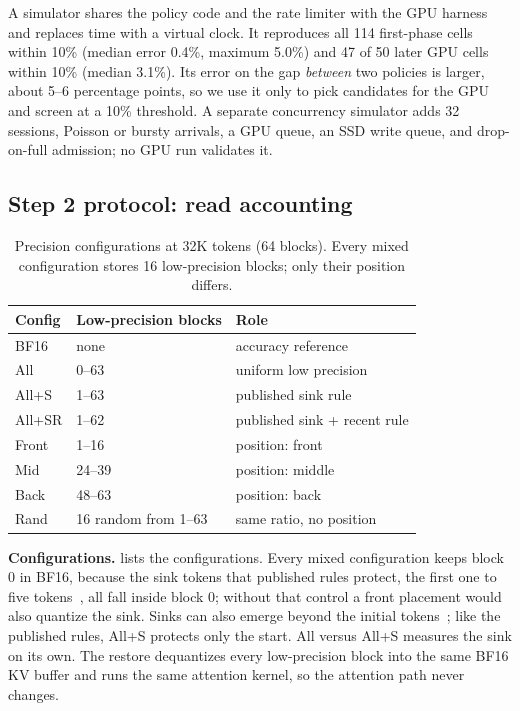 \documentclass[conference]{IEEEtran}
\newcommand{\cfg}[1]{\textsf{#1}}
\begin{document}
A simulator shares the policy code and the rate limiter with the GPU harness and replaces time with a virtual clock.
It reproduces all 114 first-phase cells within 10\% (median error 0.4\%, maximum 5.0\%) and 47 of 50 later GPU cells within 10\% (median 3.1\%).
Its error on the gap \emph{between} two policies is larger, about 5--6 percentage points, so we use it only to pick candidates for the GPU and screen at a 10\% threshold.
A separate concurrency simulator adds 32 sessions, Poisson or bursty arrivals, a GPU queue, an SSD write queue, and drop-on-full admission; no GPU run validates it.

\subsection{Step 2 protocol: read accounting}\label{sec:method-precision}

\begin{table}[t]
\centering
\caption{Precision configurations at 32K tokens (64 blocks). Every mixed configuration stores 16 low-precision blocks; only their position differs.}
\label{tab:configs}
\footnotesize
\begin{tabular}{@{}l l l@{}}
\toprule
Config & Low-precision blocks & Role \\
\midrule
\cfg{BF16} & none & accuracy reference \\
\cfg{All} & 0--63 & uniform low precision \\
\cfg{All+S} & 1--63 & published sink rule \\
\cfg{All+SR} & 1--62 & published sink + recent rule \\
\midrule
\cfg{Front} & 1--16 & position: front \\
\cfg{Mid} & 24--39 & position: middle \\
\cfg{Back} & 48--63 & position: back \\
\cfg{Rand} & 16 random from 1--63 & same ratio, no position \\
\bottomrule
\end{tabular}
\end{table}

\textbf{Configurations.}
 lists the configurations.
Every mixed configuration keeps block 0 in BF16, because the sink tokens that published rules protect, the first one to five tokens~\cite{streamingllm2024,kvquant2024,skvq2024}, all fall inside block 0; without that control a front placement would also quantize the sink.
Sinks can also emerge beyond the initial tokens~\cite{kvsink2025}; like the published rules, \cfg{All+S} protects only the start.
\cfg{All} versus \cfg{All+S} measures the sink on its own.
The restore dequantizes every low-precision block into the same BF16 KV buffer and runs the same attention kernel, so the attention path never changes.
\end{document}
